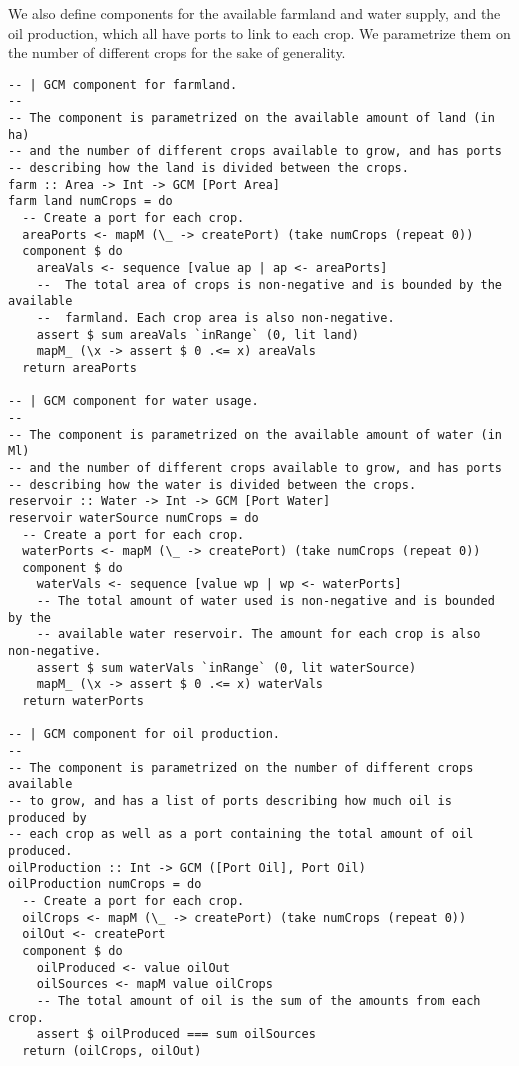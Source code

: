 \documentclass[a4paper]{article}
\begin{document}
We also define components for the available farmland and water supply, and the
oil production, which all have ports to link to each crop. We parametrize them
on the number of different crops for the sake of generality.

\begin{verbatim}
-- | GCM component for farmland.
--
-- The component is parametrized on the available amount of land (in ha)
-- and the number of different crops available to grow, and has ports
-- describing how the land is divided between the crops.
farm :: Area -> Int -> GCM [Port Area]
farm land numCrops = do
  -- Create a port for each crop.
  areaPorts <- mapM (\_ -> createPort) (take numCrops (repeat 0))
  component $ do
    areaVals <- sequence [value ap | ap <- areaPorts]
    --  The total area of crops is non-negative and is bounded by the available
    --  farmland. Each crop area is also non-negative.
    assert $ sum areaVals `inRange` (0, lit land)
    mapM_ (\x -> assert $ 0 .<= x) areaVals
  return areaPorts

-- | GCM component for water usage.
--
-- The component is parametrized on the available amount of water (in Ml)
-- and the number of different crops available to grow, and has ports
-- describing how the water is divided between the crops.
reservoir :: Water -> Int -> GCM [Port Water]
reservoir waterSource numCrops = do
  -- Create a port for each crop.
  waterPorts <- mapM (\_ -> createPort) (take numCrops (repeat 0))
  component $ do
    waterVals <- sequence [value wp | wp <- waterPorts]
    -- The total amount of water used is non-negative and is bounded by the
    -- available water reservoir. The amount for each crop is also non-negative.
    assert $ sum waterVals `inRange` (0, lit waterSource)
    mapM_ (\x -> assert $ 0 .<= x) waterVals
  return waterPorts

-- | GCM component for oil production.
--
-- The component is parametrized on the number of different crops available
-- to grow, and has a list of ports describing how much oil is produced by
-- each crop as well as a port containing the total amount of oil produced.
oilProduction :: Int -> GCM ([Port Oil], Port Oil)
oilProduction numCrops = do
  -- Create a port for each crop.
  oilCrops <- mapM (\_ -> createPort) (take numCrops (repeat 0))
  oilOut <- createPort
  component $ do
    oilProduced <- value oilOut
    oilSources <- mapM value oilCrops
    -- The total amount of oil is the sum of the amounts from each crop.
    assert $ oilProduced === sum oilSources
  return (oilCrops, oilOut)
\end{verbatim}
\end{document}
